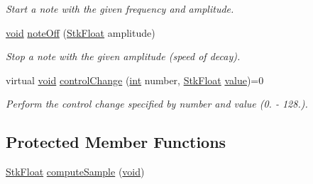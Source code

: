 \begin{DoxyCompactItemize}
\begin{DoxyCompactList}\small\item\em Start a note with the given frequency and amplitude. \end{DoxyCompactList}\item 
\hyperlink{sound_8c_ae35f5844602719cf66324f4de2a658b3}{void} \hyperlink{class_nyq_1_1_modal_a6908fb397b1b01d53e95fd7efdbf6003}{note\+Off} (\hyperlink{namespace_nyq_a044fa20a706520a617bbbf458a7db7e4}{Stk\+Float} amplitude)
\begin{DoxyCompactList}\small\item\em Stop a note with the given amplitude (speed of decay). \end{DoxyCompactList}\item 
virtual \hyperlink{sound_8c_ae35f5844602719cf66324f4de2a658b3}{void} \hyperlink{class_nyq_1_1_modal_a58a79bee4957720f631d56fd489a242e}{control\+Change} (\hyperlink{xmltok_8h_a5a0d4a5641ce434f1d23533f2b2e6653}{int} number, \hyperlink{namespace_nyq_a044fa20a706520a617bbbf458a7db7e4}{Stk\+Float} \hyperlink{lib_2expat_8h_a4a30a13b813682e68c5b689b45c65971}{value})=0
\begin{DoxyCompactList}\small\item\em Perform the control change specified by {\itshape number} and {\itshape value} (0. -\/ 128.). \end{DoxyCompactList}\end{DoxyCompactItemize}
\subsection*{Protected Member Functions}
\begin{DoxyCompactItemize}
\item 
\hyperlink{namespace_nyq_a044fa20a706520a617bbbf458a7db7e4}{Stk\+Float} \hyperlink{class_nyq_1_1_modal_aab467cc9d551f5cdc8a0c5b9a4476eaf}{compute\+Sample} (\hyperlink{sound_8c_ae35f5844602719cf66324f4de2a658b3}{void})
\end{DoxyCompactItemize}
